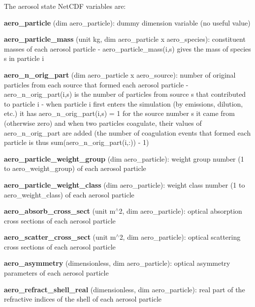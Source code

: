 The aerosol state Net\+C\+DF variables are\+:
\begin{DoxyItemize}
\item {\bfseries aero\+\_\+particle} (dim {\ttfamily aero\+\_\+particle})\+: dummy dimension variable (no useful value)
\item {\bfseries aero\+\_\+particle\+\_\+mass} (unit kg, dim {\ttfamily aero\+\_\+particle x aero\+\_\+species})\+: constituent masses of each aerosol particle -\/ {\ttfamily aero\+\_\+particle\+\_\+mass(i,s)} gives the mass of species {\ttfamily s} in particle {\ttfamily i} 
\item {\bfseries aero\+\_\+n\+\_\+orig\+\_\+part} (dim {\ttfamily aero\+\_\+particle x aero\+\_\+source})\+: number of original particles from each source that formed each aerosol particle -\/ {\ttfamily aero\+\_\+n\+\_\+orig\+\_\+part(i,s)} is the number of particles from source {\ttfamily s} that contributed to particle {\ttfamily i} -\/ when particle {\ttfamily i} first enters the simulation (by emissions, dilution, etc.) it has {\ttfamily aero\+\_\+n\+\_\+orig\+\_\+part(i,s) = 1} for the source number {\ttfamily s} it came from (otherwise zero) and when two particles coagulate, their values of {\ttfamily aero\+\_\+n\+\_\+orig\+\_\+part} are added (the number of coagulation events that formed each particle is thus {\ttfamily sum(aero\+\_\+n\+\_\+orig\+\_\+part(i,\+:)) -\/ 1})
\item {\bfseries aero\+\_\+particle\+\_\+weight\+\_\+group} (dim {\ttfamily aero\+\_\+particle})\+: weight group number (1 to {\ttfamily aero\+\_\+weight\+\_\+group}) of each aerosol particle
\item {\bfseries aero\+\_\+particle\+\_\+weight\+\_\+class} (dim {\ttfamily aero\+\_\+particle})\+: weight class number (1 to {\ttfamily aero\+\_\+weight\+\_\+class}) of each aerosol particle
\item {\bfseries aero\+\_\+absorb\+\_\+cross\+\_\+sect} (unit m$^\wedge$2, dim {\ttfamily aero\+\_\+particle})\+: optical absorption cross sections of each aerosol particle
\item {\bfseries aero\+\_\+scatter\+\_\+cross\+\_\+sect} (unit m$^\wedge$2, dim {\ttfamily aero\+\_\+particle})\+: optical scattering cross sections of each aerosol particle
\item {\bfseries aero\+\_\+asymmetry} (dimensionless, dim {\ttfamily aero\+\_\+particle})\+: optical asymmetry parameters of each aerosol particle
\item {\bfseries aero\+\_\+refract\+\_\+shell\+\_\+real} (dimensionless, dim {\ttfamily aero\+\_\+particle})\+: real part of the refractive indices of the shell of each aerosol particle

\end{DoxyItemize}
